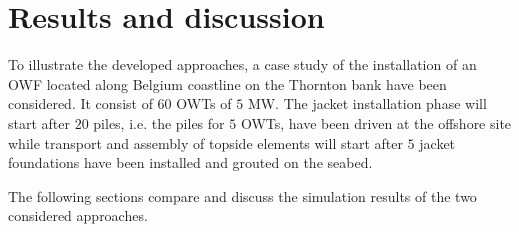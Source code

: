\section{Results and discussion}
\label{results}
To illustrate the developed approaches, a case study of the installation of an OWF located along Belgium coastline on the Thornton bank have been considered. It consist of $60$ OWTs of $5$ MW.
The jacket installation phase will start after $20$ piles, i.e. the piles for $5$ OWTs, have been driven at the offshore site while transport and assembly of topside elements will start after $5$ jacket foundations have been installed and grouted on the seabed.

The following sections compare and discuss the simulation results of the two considered approaches.